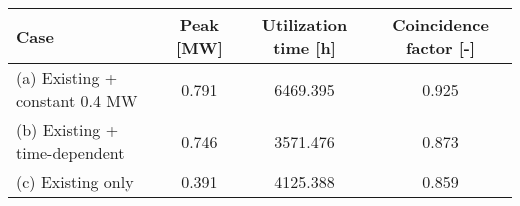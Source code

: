 \begin{tabular}{lccc}
\toprule
Case & Peak [MW] & Utilization time [h] & Coincidence factor [-] \\
\midrule
(a) Existing + constant 0.4 MW & 0.791 & 6469.395 & 0.925 \\
(b) Existing + time-dependent & 0.746 & 3571.476 & 0.873 \\
(c) Existing only & 0.391 & 4125.388 & 0.859 \\
\bottomrule
\end{tabular}